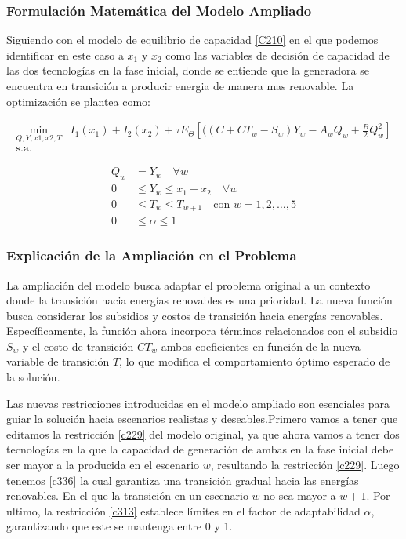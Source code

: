 \vspace{2.5mm}
\subsubsection{Formulación Matemática del Modelo Ampliado}

Siguiendo con el modelo de equilibrio de capacidad \ref{C210} en el que podemos identificar en este caso a \(x_1\) y \(x_2\) como las variables de decisión de capacidad de las dos tecnologías en la fase inicial, donde se entiende que la generadora se encuentra en transición a producir energia de manera mas renovable. La optimización se plantea como:

\begin{equation}
\begin{array}{rrclcl}
    \displaystyle \min_{Q,Y,x1,x2,T} & I_1(x_1) + I_2(x_2) + \tau E_{\Theta}\left[((C+CT_w - S_w)Y_w - A_wQ_w + \frac{B}{2}Q_w^2 \right]  \\\textrm{s.a.} \label{c331}
\end{array}
\end{equation}



\begin{align}
    Q_w &= Y_w \quad \forall w \label{c332} \\
    0 &\leq Y_w \leq x_1 + x_2 \quad \forall w \label{c333} \\
   0 &\leq T_w \leq T_{w+1} \quad \text{con } w = 1, 2, \ldots, 5 \label{c336} \\
   0 &\leq \alpha \leq 1 \quad \label{c313}
\end{align}

\subsubsection{Explicación de la Ampliación en el Problema}

La ampliación del modelo busca adaptar el problema original a un contexto donde la transición hacia energías renovables es una prioridad. La nueva función busca considerar los subsidios y costos de transición hacia energías renovables. Específicamente, la función ahora incorpora términos relacionados con el subsidio \( S_w \) y el costo de transición \( CT_w \) ambos coeficientes en función de la nueva variable de transición \( T \), lo que modifica el comportamiento óptimo esperado de la solución.

\vspace{2.5mm}
Las nuevas restricciones introducidas en el modelo ampliado son esenciales para guiar la solución hacia escenarios realistas y deseables.Primero vamos a tener que editamos la restricción \ref{c229} del modelo original, ya que ahora vamos a tener dos tecnologías en la que la capacidad de generación de ambas en la fase inicial debe ser mayor a la producida en el escenario \( w\), resultando la restricción \ref{c229}.
Luego tenemos \ref{c336} la cual garantiza una transición gradual hacia las energías renovables. En el que la transición en un escenario \( w\) no sea mayor a \( w+1\).
Por ultimo, la restricción \ref{c313} establece límites en el factor de adaptabilidad \( \alpha \), garantizando que este se mantenga entre 0 y 1. 


